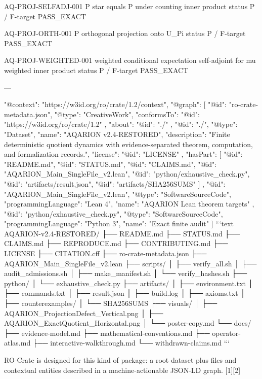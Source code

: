 AQ-PROJ-SELFADJ-001 P star equals P under counting inner product status P / F-target PASS_EXACT

AQ-PROJ-ORTH-001 P orthogonal projection onto U_Pi status P / F-target PASS_EXACT

AQ-PROJ-WEIGHTED-001 weighted conditional expectation self-adjoint for mu weighted inner product status P / F-target PASS_EXACT

---

{
  "@context": "https://w3id.org/ro/crate/1.2/context",
  "@graph": [
    {
      "@id": "ro-crate-metadata.json",
      "@type": "CreativeWork",
      "conformsTo": {
        "@id": "https://w3id.org/ro/crate/1.2"
      },
      "about": {
        "@id": "./"
      }
    },
    {
      "@id": "./",
      "@type": "Dataset",
      "name": "AQARION v2.4-RESTORED",
      "description": "Finite deterministic quotient dynamics with evidence-separated theorem, computation, and formalization records.",
      "license": {
        "@id": "LICENSE"
      },
      "hasPart": [
        {"@id": "README.md"},
        {"@id": "STATUS.md"},
        {"@id": "CLAIMS.md"},
        {"@id": "AQARION_Main_SingleFile_v2.lean"},
        {"@id": "python/exhaustive_check.py"},
        {"@id": "artifacts/result.json"},
        {"@id": "artifacts/SHA256SUMS"}
      ]
    },
    {
      "@id": "AQARION_Main_SingleFile_v2.lean",
      "@type": "SoftwareSourceCode",
      "programmingLanguage": "Lean 4",
      "name": "AQARION Lean theorem targets"
    },
    {
      "@id": "python/exhaustive_check.py",
      "@type": "SoftwareSourceCode",
      "programmingLanguage": "Python 3",
      "name": "Exact finite audit"
    }
  ]
}```text
AQARION-v2.4-RESTORED/
├── README.md
├── STATUS.md
├── CLAIMS.md
├── REPRODUCE.md
├── CONTRIBUTING.md
├── LICENSE
├── CITATION.cff
├── ro-crate-metadata.json
├── AQARION_Main_SingleFile_v2.lean
├── scripts/
│   ├── verify_all.sh
│   ├── audit_admissions.sh
│   ├── make_manifest.sh
│   └── verify_hashes.sh
├── python/
│   └── exhaustive_check.py
├── artifacts/
│   ├── environment.txt
│   ├── commands.txt
│   ├── result.json
│   ├── build.log
│   ├── axioms.txt
│   ├── counterexamples/
│   └── SHA256SUMS
├── visuals/
│   ├── AQARION_ProjectionDefect_Vertical.png
│   ├── AQARION_ExactQuotient_Horizontal.png
│   └── poster-copy.md
└── docs/
    ├── evidence-model.md
    ├── mathematical-conventions.md
    ├── operator-atlas.md
    ├── interactive-walkthrough.md
    └── withdrawn-claims.md
```

RO-Crate is designed for this kind of package: a root dataset plus files and contextual entities described in a machine-actionable JSON-LD graph. [1][2]

